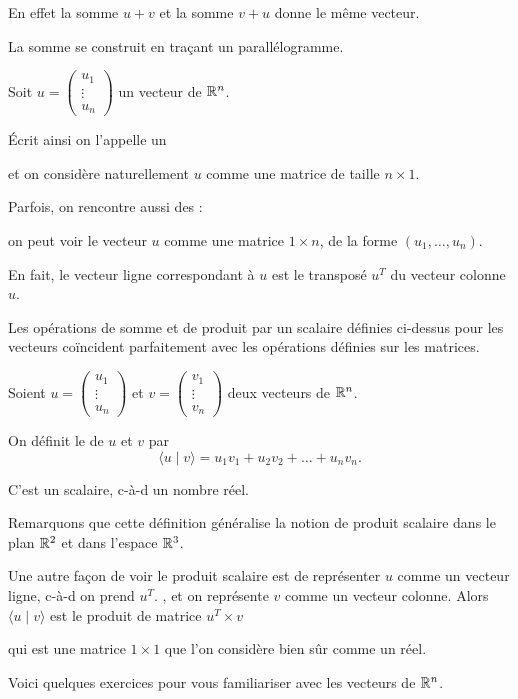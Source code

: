 En effet la somme $u+v$ et la somme $v+u$ donne le même vecteur.

La somme se construit en traçant un parallélogramme.

\diapo

Soit 
$u = \left(\begin{smallmatrix} u_1\\ \vdots \\ u_n \end{smallmatrix}\right)$ 
un vecteur de $\mathbb{R}^n$. 

\change
\'Ecrit ainsi on l'appelle un  

\change
et on considère naturellement $u$ comme une matrice de taille $n\times 1$. 

\change
Parfois, on rencontre aussi des  : 

\change
on peut voir le vecteur $u$ comme une matrice $1\times n$, de la forme
$(u_1,\dots,u_n)$. 

\change
En fait, le vecteur ligne correspondant à $u$
est le transposé $u^T$ du vecteur colonne $u$.

Les opérations de somme et de produit par un scalaire définies ci-dessus 
pour les vecteurs coïncident parfaitement avec les opérations définies sur
les matrices.


\diapo

Soient $u = \left(\begin{smallmatrix} u_1\\ \vdots \\ u_n \end{smallmatrix}\right)$ 
et $v = \left(\begin{smallmatrix} v_1\\ \vdots \\ v_n \end{smallmatrix}\right)$
deux vecteurs de $\mathbb{R}^n$. 


\change
On définit le  de $u$ et $v$  par
$$\langle u \mid v \rangle = u_1 v_1 + u_2 v_2 + \dots + u_nv_n.$$

\change
C'est un scalaire, c-à-d un nombre réel. 

Remarquons que cette définition généralise la notion 
de produit scalaire dans le plan $\mathbb{R}^2$ et dans l'espace $\mathbb{R}^3$.

\change

Une autre façon de voir le produit scalaire
est de représenter $u$ comme un vecteur ligne, c-à-d on prend $u^T$.
,
et on représente $v$ comme un vecteur colonne.
Alors $\langle u \mid v \rangle$ est le produit de matrice $u^T \times v$ 

qui est une matrice $1\times 1$ que l'on considère bien sûr comme un réel.


\diapo

Voici quelques exercices pour vous familiariser avec les vecteurs de $\mathbb{R}^n$.


